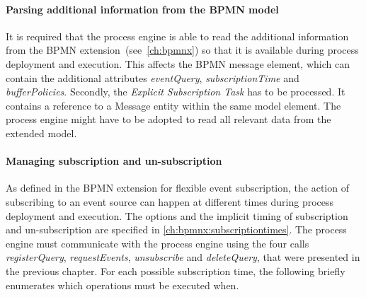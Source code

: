 \paragraph{Parsing additional information from the BPMN model}
It is required that the process engine is able to read the additional information from the BPMN extension~(see~\autoref{ch:bpmnx}) so that it is available during process deployment and execution.
This affects the BPMN message element, which can contain the additional attributes \textit{eventQuery}, \textit{subscriptionTime} and \textit{bufferPolicies}.
Secondly, the \textit{Explicit Subscription Task} has to be processed. It contains a reference to a Message entity within the same model element.
The process engine might have to be adopted to read all relevant data from the extended model.


\paragraph{Managing subscription and un-subscription}
As defined in the BPMN extension for flexible event subscription, the action of subscribing to an event source can happen at different times during process deployment and execution. The options and the implicit timing of subscription and un-subscription are specified in \autoref{ch:bpmnx:subscriptiontimes}.
The process engine must communicate with the process engine using the four calls \textit{registerQuery}, \textit{requestEvents}, \textit{unsubscribe} and \textit{deleteQuery}, that were presented in the previous chapter.
For each possible subscription time, the following briefly enumerates which operations must be executed when. 

